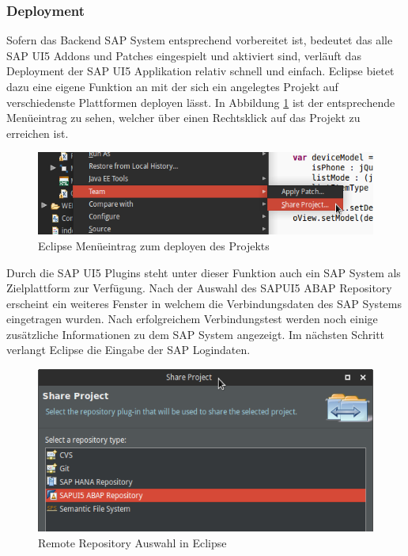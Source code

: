 \subsubsection{Deployment}
Sofern das Backend SAP System entsprechend vorbereitet ist, bedeutet das alle SAP UI5 Addons und Patches eingespielt und aktiviert sind, verläuft das Deployment der SAP UI5 Applikation relativ schnell und einfach. Eclipse bietet dazu eine eigene Funktion an mit der sich ein angelegtes Projekt auf verschiedenste Plattformen deployen lässt. In Abbildung \ref{fig:eclipseshare} ist der entsprechende Menüeintrag zu sehen, welcher über einen Rechtsklick auf das Projekt zu erreichen ist.

\vspace{1em}
\begin{figure}[htb]
  \centering
  \includegraphics[width=0.8\linewidth]{abb/eclipse_share_project}
  \caption[Eclipse Menüeintrag zum deployen des Projekts]{Eclipse Menüeintrag zum deployen des Projekts}
  \label{fig:eclipseshare}
\end{figure}

Durch die SAP UI5 Plugins steht unter dieser Funktion auch ein SAP System als Zielplattform zur Verfügung. Nach der Auswahl des SAPUI5 ABAP Repository erscheint ein weiteres Fenster in welchem die Verbindungsdaten des SAP Systems eingetragen wurden. Nach erfolgreichem Verbindungstest werden noch einige zusätzliche Informationen zu dem SAP System angezeigt. Im nächsten Schritt verlangt Eclipse die Eingabe der SAP Logindaten.

\vspace{1em}
\begin{figure}[htb]
  \centering
  \includegraphics[width=0.8\linewidth]{abb/eclipse_share_project_window}
  \caption[Remote Repository Auswahl in Eclipse]{Remote Repository Auswahl in Eclipse}
  \label{fig:eclipsesharewindow}
\end{figure}

